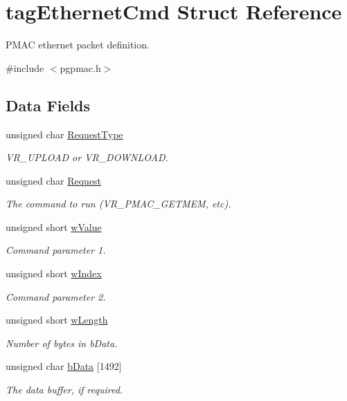 \hypertarget{structtagEthernetCmd}{\section{tag\-Ethernet\-Cmd Struct Reference}
\label{structtagEthernetCmd}
}


P\-M\-A\-C ethernet packet definition.  




{\ttfamily \#include $<$pgpmac.\-h$>$}

\subsection*{Data Fields}
\begin{DoxyCompactItemize}
\item 
unsigned char \hyperlink{structtagEthernetCmd_a6a155eb3ae546dd29369c4a33ddb3310}{Request\-Type}
\begin{DoxyCompactList}\small\item\em V\-R\-\_\-\-U\-P\-L\-O\-A\-D or V\-R\-\_\-\-D\-O\-W\-N\-L\-O\-A\-D. \end{DoxyCompactList}\item 
unsigned char \hyperlink{structtagEthernetCmd_a0dc566e7edbb226f1a4ea443d93d56e2}{Request}
\begin{DoxyCompactList}\small\item\em The command to run (V\-R\-\_\-\-P\-M\-A\-C\-\_\-\-G\-E\-T\-M\-E\-M, etc). \end{DoxyCompactList}\item 
unsigned short \hyperlink{structtagEthernetCmd_aec0ee9a5f6c7e3bc6e4bd98f1bd52783}{w\-Value}
\begin{DoxyCompactList}\small\item\em Command parameter 1. \end{DoxyCompactList}\item 
unsigned short \hyperlink{structtagEthernetCmd_a92f5a374e87d4f496b64b4888850d6e6}{w\-Index}
\begin{DoxyCompactList}\small\item\em Command parameter 2. \end{DoxyCompactList}\item 
unsigned short \hyperlink{structtagEthernetCmd_af5df25ff13ca30fa33719d0df1ab7e97}{w\-Length}
\begin{DoxyCompactList}\small\item\em Number of bytes in b\-Data. \end{DoxyCompactList}\item 
unsigned char \hyperlink{structtagEthernetCmd_a872dab798127d6f589974a79c5d0aef1}{b\-Data} \mbox{[}1492\mbox{]}
\begin{DoxyCompactList}\small\item\em The data buffer, if required. \end{DoxyCompactList}\end{DoxyCompactItemize}


